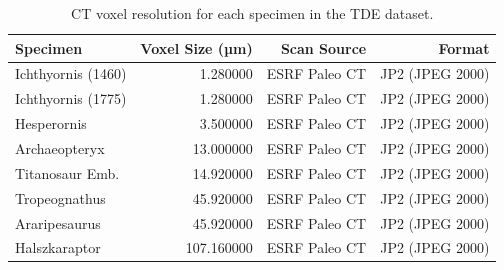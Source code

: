\begin{table}[htbp]
\caption{CT voxel resolution for each specimen in the TDE dataset.}
\label{tab:voxel_sizes}
\begin{tabular}{lrrr}
\toprule
Specimen & Voxel Size (µm) & Scan Source & Format \\
\midrule
Ichthyornis (1460) & 1.280000 & ESRF Paleo CT & JP2 (JPEG 2000) \\
Ichthyornis (1775) & 1.280000 & ESRF Paleo CT & JP2 (JPEG 2000) \\
Hesperornis & 3.500000 & ESRF Paleo CT & JP2 (JPEG 2000) \\
Archaeopteryx & 13.000000 & ESRF Paleo CT & JP2 (JPEG 2000) \\
Titanosaur Emb. & 14.920000 & ESRF Paleo CT & JP2 (JPEG 2000) \\
Tropeognathus & 45.920000 & ESRF Paleo CT & JP2 (JPEG 2000) \\
Araripesaurus & 45.920000 & ESRF Paleo CT & JP2 (JPEG 2000) \\
Halszkaraptor & 107.160000 & ESRF Paleo CT & JP2 (JPEG 2000) \\
\bottomrule
\end{tabular}
\end{table}
